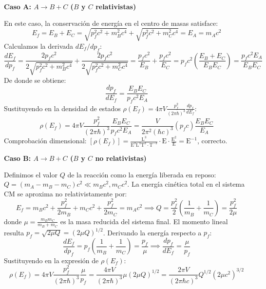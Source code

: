 \textbf{Caso A: $A \to B + C$ ($B$ y $C$ relativistas)}

En este caso, la conservación de energía en el centro de masas satisface:
\begin{equation}
E_f = E_B + E_C = \sqrt{p_f^2 c^2 + m_B^2 c^4} + \sqrt{p_f^2 c^2 + m_C^2 c^4} = E_A = m_A c^2
\end{equation}
Calculamos la derivada $dE_f / dp_f$:
\begin{equation}
\frac{dE_f}{dp_f} = \frac{2 p_f c^2}{2\sqrt{p_f^2 c^2 + m_B^2 c^4}} + \frac{2 p_f c^2}{2\sqrt{p_f^2 c^2 + m_C^2 c^4}} = \frac{p_f c^2}{E_B} + \frac{p_f c^2}{E_C} = p_f c^2 \left( \frac{E_B + E_C}{E_B E_C} \right) = \frac{p_f c^2 E_A}{E_B E_C}
\end{equation}
De donde se obtiene:
\begin{equation}
\frac{dp_f}{dE_f} = \frac{E_B E_C}{p_f c^2 E_A}
\end{equation}
Sustituyendo en la densidad de estados $\rho(E_f) = 4\pi V \frac{p_f^2}{(2\pi\hbar)^3} \frac{dp_f}{dE_f}$:
\begin{equation}
\rho(E_f) = 4\pi V \frac{p_f^2}{(2\pi\hbar)^3} \frac{E_B E_C}{p_f c^2 E_A} = \frac{V}{2\pi^2 (\hbar c)^3} (p_f c) \frac{E_B E_C}{E_A}
\end{equation}
Comprobación dimensional: $[\rho(E_f)] = \frac{\text{L}^3}{\text{E}^3 \text{L}^3 \text{T}^3 \cdot \text{T}^{-3}} \cdot \text{E} \cdot \frac{\text{E}^2}{\text{E}} = \text{E}^{-1}$, correcto.

\textbf{Caso B: $A \to B + C$ ($B$ y $C$ no relativistas)}

Definimos el valor $Q$ de la reacción como la energía liberada en reposo: $Q = (m_A - m_B - m_C)c^2 \ll m_B c^2, m_C c^2$.
La energía cinética total en el sistema CM se aproxima no relativistamente por:
\begin{equation}
E_f = m_B c^2 + \frac{p_f^2}{2m_B} + m_C c^2 + \frac{p_f^2}{2m_C} = m_A c^2 \implies Q = \frac{p_f^2}{2} \left( \frac{1}{m_B} + \frac{1}{m_C} \right) = \frac{p_f^2}{2\mu}
\end{equation}
donde $\mu = \frac{m_B m_C}{m_B + m_C}$ es la masa reducida del sistema final.
El momento lineal resulta $p_f = \sqrt{2\mu Q} = (2\mu Q)^{1/2}$. Derivando la energía respecto a $p_f$:
\begin{equation}
\frac{dE_f}{dp_f} = p_f \left( \frac{1}{m_B} + \frac{1}{m_C} \right) = \frac{p_f}{\mu} \implies \frac{dp_f}{dE_f} = \frac{\mu}{p_f}
\end{equation}
Sustituyendo en la expresión de $\rho(E_f)$:
\begin{equation}
\rho(E_f) = 4\pi V \frac{p_f^2}{(2\pi\hbar)^3} \frac{\mu}{p_f} = \frac{4\pi V}{(2\pi\hbar)^3} \mu (2\mu Q)^{1/2} = \frac{2\pi V}{(2\pi\hbar c)^3} Q^{1/2} (2\mu c^2)^{3/2}
\end{equation}

